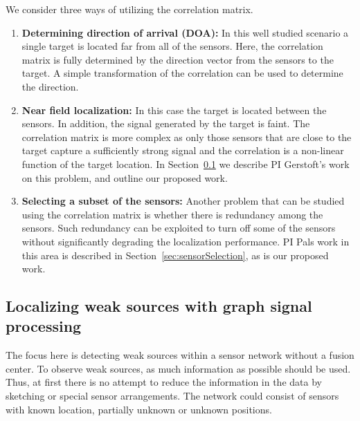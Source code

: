 We consider three ways of utilizing the correlation matrix.
\begin{enumerate}
\item {\bf Determining direction of arrival (DOA):} In this well studied scenario a single target is located far from all of the sensors. Here, the correlation matrix is fully determined by the direction vector from the sensors to the target. A simple transformation of the correlation can be used to determine the direction.
\item {\bf Near field localization:} In this case the target is located between the sensors. In addition, the signal generated by the target is faint. The correlation matrix is more complex as only those sensors that are close to the target capture a sufficiently strong signal and the correlation is a non-linear function of the target location. In Section~\ref{sec:weakSources} we describe PI Gerstoft's work on this problem, and outline our proposed work.
\item {\bf Selecting a subset of the sensors:} Another problem that can be studied using the correlation matrix is whether there is redundancy among the sensors. Such redundancy can be exploited to turn off some of the sensors without significantly degrading the localization performance. PI Pals work in this area is described in Section~\ref{sec:sensorSelection}, as is our proposed work.
\end{enumerate}

\subsection{Localizing weak sources with graph signal processing}
 \label{sec:weakSources}


The focus here is detecting weak sources within a sensor network without a fusion center. To observe weak sources, as much information as possible should be used. Thus, at first there is no attempt to reduce the information in the data by sketching or special sensor arrangements. The network could consist of sensors with known location, partially unknown or unknown positions.


